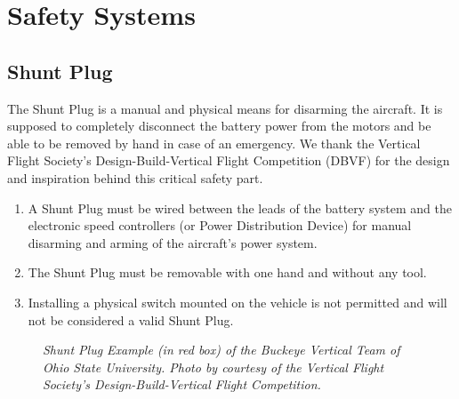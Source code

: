 \documentclass{article}
\begin{document}
\section{Safety Systems}

\subsection{Shunt Plug}
The Shunt Plug is a manual and physical means for disarming the aircraft. It is supposed to completely disconnect the battery power from the motors and be able to be removed by hand in case of an emergency. We thank the Vertical Flight Society's Design-Build-Vertical Flight Competition (DBVF) for the design and inspiration behind this critical safety part. 
\begin{enumerate}
  \item A Shunt Plug must be wired between the leads of the battery system and the electronic speed controllers (or Power Distribution Device) for manual disarming and arming of the aircraft's power system.
  \item The Shunt Plug must be removable with one hand and without any tool.
  \item Installing a physical switch mounted on the vehicle is not permitted and will not be considered a valid Shunt Plug.
  \end{enumerate}

  \begin{figure}[h!]
    \centering
   \caption{\textit{Shunt Plug Example (in red box) of the Buckeye Vertical Team of Ohio State University. Photo by courtesy of the Vertical Flight Society's Design-Build-Vertical Flight Competition.}}
   \end{figure}
\end{document}
